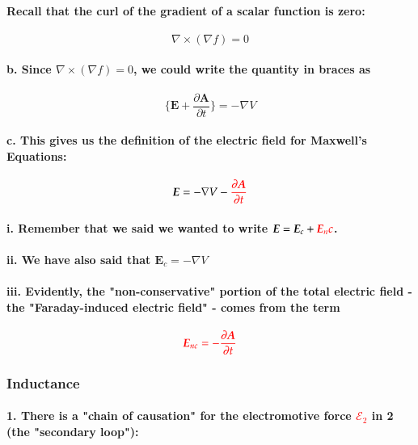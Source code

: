 \documentclass{article}
\begin{document}
\paragraph{\indent Recall that the curl of the gradient of a scalar function is zero:}
\begin{equation*}
    \nabla\times(\nabla f)=0
\end{equation*}
\paragraph{\indent b. Since $\nabla\times(\nabla f)=0$, we could write the quantity in braces as}
\begin{equation*}
    \bigg\{\boldsymbol{E}+\frac{\partial\boldsymbol{A}}{\partial t}\bigg\}=-\nabla V
\end{equation*}
\paragraph{\indent c. This gives us the definition of the electric field for Maxwell's Equations:}
\begin{equation*}
    \boldsymbol{E}=-\nabla V-\textcolor{red}{\frac{\partial\boldsymbol{A}}{\partial t}}
\end{equation*}
\paragraph{\indent\indent i. Remember that we said we wanted to write $\boldsymbol{E}=\boldsymbol{E}_c+\textcolor{red}{\boldsymbol{E}_nc}$.}
\paragraph{\indent\indent ii. We have also said that $\boldsymbol{E}_c=-\nabla V$}
\paragraph{\indent\indent iii. Evidently, the "non-conservative" portion of the total electric field - the "Faraday-induced electric field" - comes from the term}
\begin{equation*}
    \textcolor{red}{\boldsymbol{E}_{nc}=-\frac{\partial\boldsymbol{A}}{\partial t}}
\end{equation*}
\subsubsection{Inductance}
\paragraph{1. There is a "chain of causation" for the electromotive force \textcolor{red}{$\mathcal{E}_2$} in \textcircled{2} (the "secondary loop"):}
\end{document}
